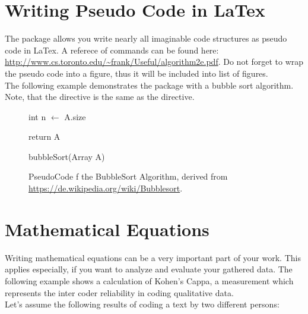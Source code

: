 \section{Writing Pseudo Code in LaTex}


The package  allows you write nearly all imaginable code structures as pseudo code in LaTex. A referece of commands can be found here: \url{http://www.cs.toronto.edu/~frank/Useful/algorithm2e.pdf}. Do not forget to wrap the pseudo code into a figure, thus it will be included into list of figures.\\

The following example demonstrates the package with a bubble sort algorithm. Note, that the directive  is the same as the  directive.

\begin{figure}[H]
\begin{algorithm}[H]

int n $\leftarrow$ A.size 



return A
\caption{bubbleSort(Array A)}
\end{algorithm}
\caption[BubbleSort Algorithm Pseudocoe]{PseudoCode f the BubbleSort Algorithm, derived from \url{https://de.wikipedia.org/wiki/Bubblesort}.}
\end{figure}


\newpage
\section{Mathematical Equations}

Writing mathematical equations can be a very important part of your work. This applies especially, if you want to analyze and evaluate your gathered data. The following example shows a calculation of Kohen's Cappa, a measurement which represents the inter coder reliability in coding qualitative data.\\

Let's assume the following results of coding a text by two different persons:

